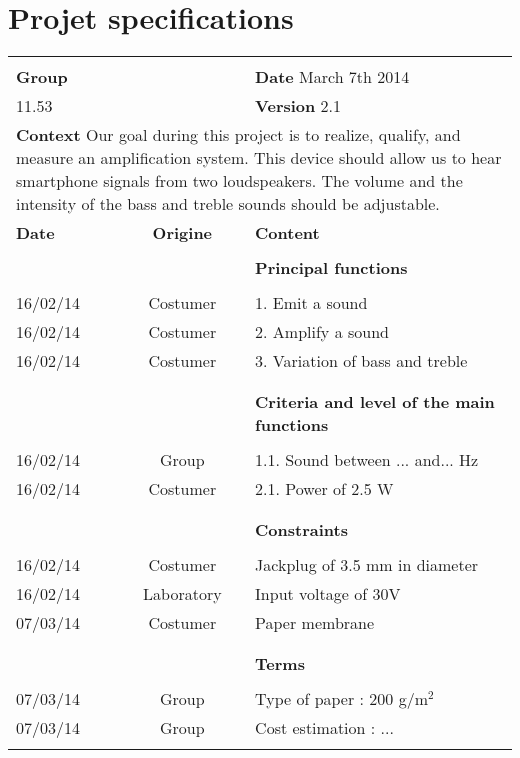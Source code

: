 

\section{Projet specifications}

\begin{table*} [h]

\begin{tabular}{|l|c|l|}

\hline
&&\\
\textbf{Group} & & \hfill \textbf{Date}  March 7th 2014\\
11.53 && \hfill \textbf{Version} 2.1\\

\hline
\multicolumn{3}{|p{15cm}|}{\textbf{Context} \newline
Our goal during this project is to realize, qualify, and measure an amplification system. This device should allow us to hear smartphone signals from two loudspeakers. The volume and the intensity of the bass and treble sounds should be adjustable.}  \\


\hline
\textbf{Date} & \textbf{Origine} & \textbf{Content}\\
\hline
&&\\
&&\textbf{Principal functions}\\
&&\\
16/02/14 & Costumer & 1. Emit a sound \\
16/02/14 & Costumer & 2. Amplify a sound \\
16/02/14 & Costumer & 3. Variation of bass and treble \\
&&\\
\hline
&&\\
& & \textbf{Criteria and level of the main functions} \\
&&\\
16/02/14 & Group & 1.1. Sound between ... and... Hz \\
16/02/14 & Costumer & 2.1. Power of 2.5 W \\
&&\\
\hline
&&\\
& & \textbf{Constraints} \\
&&\\
16/02/14 & Costumer &   Jackplug of 3.5 mm in diameter\\
16/02/14 & Laboratory &  Input voltage of 30V \\
07/03/14 & Costumer&  Paper membrane \\
&&\\
\hline
&&\\
& & \textbf{Terms} \\
&&\\
07/03/14 & Group & Type of paper : 200 g/m$^{2}$ \\
07/03/14 & Group & Cost estimation : ...\\

&&\\
\hline
\end{tabular}

\end{table*}


